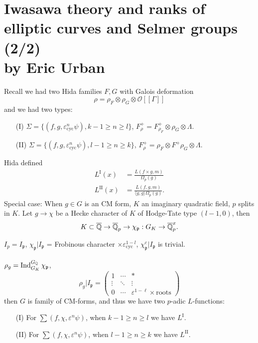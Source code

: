 \documentclass[12pt,amsfont]{amsart}
\begin{document}
\begingroup
\renewcommand{\addcontentsline}[3]{}%
\endgroup

\newpage
\renewcommand{\thesubsection}{\arabic{section}.\arabic{subsection}}

\section{Iwasawa theory and ranks of elliptic curves and Selmer groups (2/2)\\ by Eric Urban}\label{3}
Recall we had two Hida families $F, G$ with Galois deformation
\[
\rho=\rho_F\otimes \rho_G \otimes \mathcal{O}[[\Gamma]]
\]
and we had two types:
\begin{enumerate}
\item[(I)] $\Sigma = \{(f,g, \varepsilon_{\text{cyc}}^n \psi), k-1 \geq n \geq l\}$, $F_\rho^+ = F_{\rho_{F}}^+ \otimes \rho_G \otimes \Lambda$.
\item[(II)]
 $\Sigma = \{(f,g, \varepsilon_{\text{cyc}}^n \psi), l-1 \geq n \geq k\}$, $F_\rho^+ = \rho_F \otimes F^+ \rho_G \otimes \Lambda$.
 \end{enumerate}
Hida defined
\begin{align*}
L^{\textrm{I}}(x) &= \frac{L(f\times g,m)}{\Omega_p(g)}\\
L^{\textrm{II}}(x) &= \frac{L(f,g,m)}{\langle g, g\rangle \Omega_p(g)}. 
\end{align*}
Special case: When $g\in G$ is an CM form, $K$ an imaginary quadratic field, $p$ splits in $K$. Let $g \rightarrow \chi$ be a Hecke character of $K$ of Hodge-Tate type $(l-1, 0)$,  then
\[
\displaystyle K \subset \overline{{\mathbb Q}} \rightarrow \overline{{\mathbb Q}}_p \rightarrow \chi_{\mathfrak{p}} : G_K \rightarrow \overline{{\mathbb Q}}_p^x.
\]

$I_p = I_{\mathfrak{p}}$, $\chi_{\mathfrak{p}} | I_{\mathfrak{p}}$ = Frobinous character $\times \varepsilon_{\text{cyc}}^{1 - l}$, $\chi_{\mathfrak{p}}^c | I_{\mathfrak{p}}$ is trivial. \\ \\
$\rho_g = \operatorname{Ind}_{G_K}^{G_{\mathbb Q}} \chi_{\mathfrak{p}}$, 
$$\rho_g | I_{\mathfrak{p}} = \begin{pmatrix} 1 & \cdots & \ast \\ \vdots & \ddots & \vdots \\ 0 & \cdots & \varepsilon^{1 - \ell} \times \text{roots} \end{pmatrix}$$
then $G$ is family of CM-forms, and thus we have two $p$-adic $L$-functions:
\begin{enumerate}
\item[(I)] 
For $\sum(f, \chi, \varepsilon^n\psi)$, when $k-1 \ge n \ge l$ we have $L^{\textrm{I}}$.
\item[(II)]
For $\sum(f, \chi, \varepsilon^n\psi)$, when $l-1 \ge n \ge k$ we have $L^{\textrm{II}}$.
\end{enumerate}
\end{document}
